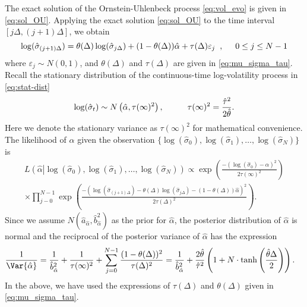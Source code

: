 The exact solution of the Ornstein-Uhlenbeck process \eqref{eq:vol_evo} is given in \eqref{eq:sol_OU}.  Applying the exact solution \eqref{eq:sol_OU} to the time interval $[j\Delta, (j+1)\Delta]$, we obtain
$$
  \log( \hat{ \sigma }_{(j+1)\Delta}) = \theta(\Delta) \log( \hat{ \sigma}_{j\Delta}) + (1-\theta(\Delta)) \hat{\alpha} +  \tau(\Delta) \varepsilon_j \;\; , \hspace{0.5cm} 0\le j \le N-1
$$
where $\varepsilon_j \sim N(0, 1)$, and $\theta(\Delta)$ and $\tau(\Delta)$ are given in \eqref{eq:mu_sigma_tau}.  Recall the stationary distribution of the continuous-time log-volatility process in \eqref{eq:stat-dist}
$$
  \log(\hat{\sigma}_t) \sim N \left( \hat{\alpha} , \tau(\infty)^2 \right), \hspace*{1cm} \tau(\infty)^2 = \frac{\hat{\tau}^2}{2\hat{\theta}}.
$$
Here we denote the stationary variance as $\tau(\infty)^2$ for mathematical convenience.  The likelihood of $\hat{\alpha} $ given the observation $\{\log(\hat{\sigma}_0), \log(\hat{\sigma}_1), \ldots, \log(\hat{\sigma}_N)\}$ is
\begin{multline}\label{likelihood_alpha_n1}
L \left(\hat{\alpha} \left| \log(\hat{\sigma}_0), \log(\hat{\sigma}_1), \ldots, \log(\hat{\sigma}_N) \right. \right) \propto \exp\left( \frac{-(\log(\hat{\sigma}_0)-\hat{\alpha})^2}{2 \tau(\infty)^2} \right)  \\
%
 \times \prod_{j-0}^{N-1} \exp\left( \frac{-\left(\log\left(\hat{\sigma}_{(j+1)\Delta}\right) - \theta(\Delta) \log(\hat{\sigma}_{j\Delta})-(1-\theta(\Delta)) \hat{\alpha}\right)^2}{2 \tau(\Delta)^2} \right).
\end{multline}
Since we assume $N(\hat{a}_{\hat{\alpha}}, \hat{b}^2_{\hat{\alpha}})$ as the prior for $\hat{\alpha}$, the posterior distribution of $\hat{\alpha}$ is normal and the reciprocal of the posterior variance of $\hat{\alpha}$ has the expression
\begin{align}
  \frac{1}{\Var{\hat{\alpha}} } &= \frac{1}{\hat{b}^2_{\hat{\alpha}}}  + \frac{1}{\tau(\infty)^2} + \sum_{j=0}^{N-1} \frac{(1-\theta(\Delta))^2}{\tau(\Delta)^2}  %
                                            = \frac{1}{\hat{b}^2_{\hat{\alpha}} }+ \frac{2\hat{\theta} }{\hat{\tau}^2} \left(1 + N \cdot \tanh\left(\frac{\hat{\theta} \Delta}{2} \right) \right).  \label{var_alpha_n1}
\end{align}
In the above, we have used the expressions of $\tau(\Delta )$ and $\theta(\Delta )$ given in \eqref{eq:mu_sigma_tau}.

